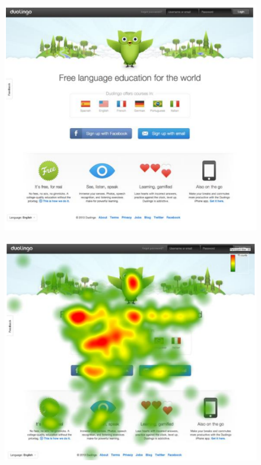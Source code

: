 \documentclass[12pt]{article}
\begin{document}
\begin{figure}[h]
\centering
\begin{minipage}{.43\textwidth}
    \centering
    \includegraphics[width=\linewidth]{Figuras/Duolingo.png}
    \label{fig:Duolingo}
\end{minipage}%
\begin{minipage}{.48\textwidth}
    \centering
    \includegraphics[width=\linewidth]{Figuras/DuolingoHM.png}
    \label{fig:DuolingoHM}
\end{minipage}
\end{figure}
\end{document}
